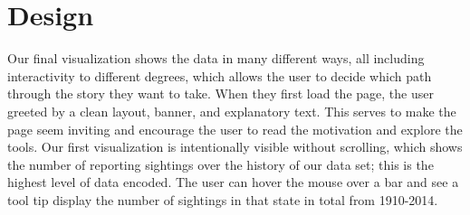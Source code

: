 \documentclass[journal]{vgtc}                %
\begin{document}



\section{Design}


%
%
%

%
%
%


Our final visualization shows the data in many different ways, all including interactivity to different degrees, which allows the user to decide which path through the story they want to take. When they first load the page, the user greeted by a clean layout, banner, and explanatory text. This serves to make the page seem inviting and encourage the user to read the motivation and explore the tools. Our first visualization is intentionally visible without scrolling, which shows the number of reporting sightings over the history of our data set; this is the highest level of data encoded. The user can hover the mouse over a bar and see a tool tip display the number of sightings in that state in total from 1910-2014.
\end{document}
